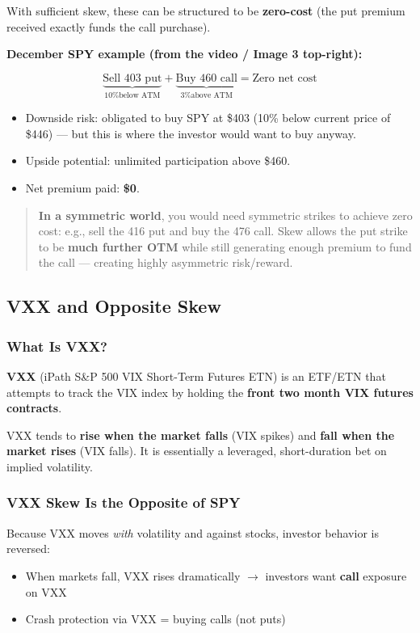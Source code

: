 \documentclass[12pt,openany]{book}
\begin{document}
With sufficient skew, these can be structured to be \textbf{zero-cost} (the put premium received exactly funds the call purchase).

\textbf{December SPY example (from the video / Image 3 top-right):}

\[
\underbrace{\text{Sell 403 put}}_{\text{10\% below ATM}} + \underbrace{\text{Buy 460 call}}_{\text{3\% above ATM}} = \text{Zero net cost}
\]

\begin{itemize}[leftmargin=*]
    \item Downside risk: obligated to buy SPY at \$403 (10\% below current price of \$446) — but this is where the investor would want to buy anyway.
    \item Upside potential: unlimited participation above \$460.
    \item Net premium paid: \textbf{\$0}.
\end{itemize}

\begin{quote}
\textbf{In a symmetric world}, you would need symmetric strikes to achieve zero cost: e.g., sell the 416 put and buy the 476 call. Skew allows the put strike to be \textbf{much further OTM} while still generating enough premium to fund the call — creating highly asymmetric risk/reward.
\end{quote}

\subsection{VXX and Opposite Skew}

\subsubsection{What Is VXX?}

\textbf{VXX} (iPath S\&P 500 VIX Short-Term Futures ETN) is an ETF/ETN that attempts to track the VIX index by holding the \textbf{front two month VIX futures contracts}.

VXX tends to \textbf{rise when the market falls} (VIX spikes) and \textbf{fall when the market rises} (VIX falls). It is essentially a leveraged, short-duration bet on implied volatility.

\subsubsection{VXX Skew Is the Opposite of SPY}

Because VXX moves \emph{with} volatility and against stocks, investor behavior is reversed:
\begin{itemize}[leftmargin=*]
    \item When markets fall, VXX rises dramatically \(\rightarrow\) investors want \textbf{call} exposure on VXX
    \item Crash protection via VXX = buying calls (not puts)
\end{itemize}
\end{document}
